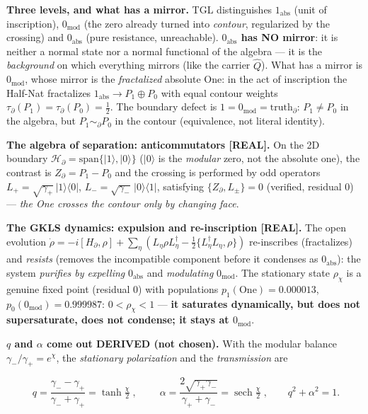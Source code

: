 \documentclass[11pt]{article}
\theoremstyle{definition}\newtheorem{deriv}{Derivation}
\begin{document}
\textbf{Three levels, and what has a mirror.} TGL distinguishes $1_{\mathrm{abs}}$ (unit of inscription), $0_{\mathrm{mod}}$ (the zero already turned into \emph{contour}, regularized by the crossing) and $0_{\mathrm{abs}}$ (pure resistance, unreachable). \textbf{$0_{\mathrm{abs}}$ has NO mirror}: it is neither a normal state nor a normal functional of the algebra --- it is the \emph{background} on which everything mirrors (like the carrier $\hat Q$). What has a mirror is $0_{\mathrm{mod}}$, whose mirror is the \emph{fractalized} absolute One: in the act of inscription the Half-Nat fractalizes $1_{\mathrm{abs}}\to P_1\oplus P_0$ with equal contour weights $\tau_\partial(P_1)=\tau_\partial(P_0)=\tfrac12$. The boundary defect is $\boxed{1=0_{\mathrm{mod}}=\mathrm{truth}_\partial}$: $P_1\neq P_0$ in the algebra, but $P_1\sim_\partial P_0$ in the contour (equivalence, not literal identity).

\textbf{The algebra of separation: anticommutators \textsf{[REAL]}.} On the 2D boundary $\mathcal H_\partial=\mathrm{span}\{|1\rangle,|0\rangle\}$ ($|0\rangle$ is the \emph{modular} zero, not the absolute one), the contrast is $Z_\partial=P_1-P_0$ and the crossing is performed by odd operators $L_+=\sqrt{\gamma_+}\,|1\rangle\langle0|$, $L_-=\sqrt{\gamma_-}\,|0\rangle\langle1|$, satisfying $\boxed{\{Z_\partial,L_\pm\}=0}$ (verified, residual $0$) --- \emph{the One crosses the contour only by changing face}.

\textbf{The GKLS dynamics: expulsion and re-inscription \textsf{[REAL]}.} The open evolution $\dot\rho=-i[H_\partial,\rho]+\sum_\eta(L_\eta\rho L_\eta^\dagger-\tfrac12\{L_\eta^\dagger L_\eta,\rho\})$ re-inscribes (fractalizes) and \emph{resists} (removes the incompatible component before it condenses as $0_{\mathrm{abs}}$): the system \emph{purifies by expelling} $0_{\mathrm{abs}}$ and \emph{modulating} $0_{\mathrm{mod}}$. The stationary state $\rho_\chi$ is a genuine fixed point (residual $0$) with populations $p_1(\mathrm{One})=0.000013$, $p_0(0_{\mathrm{mod}})=0.999987$: $0<\rho_\chi<1$ --- \textbf{it saturates dynamically, but does not supersaturate, does not condense; it stays at $0_{\mathrm{mod}}$}.

\textbf{$q$ and $\alpha$ come out DERIVED (not chosen).} With the modular balance $\gamma_-/\gamma_+=e^\chi$, the \emph{stationary polarization} and the \emph{transmission} are

\begin{equation}\boxed{\;q=\frac{\gamma_--\gamma_+}{\gamma_-+\gamma_+}=\tanh\tfrac\chi2\;},\qquad \boxed{\;\alpha=\frac{2\sqrt{\gamma_+\gamma_-}}{\gamma_++\gamma_-}=\operatorname{sech}\tfrac\chi2\;},\qquad q^2+\alpha^2=1.\end{equation}
\end{document}
